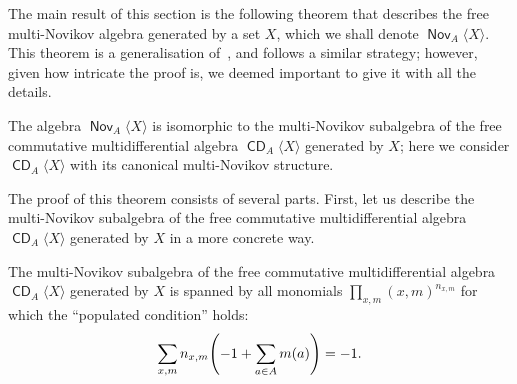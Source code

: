 \documentclass[AHL,Unicode,longabstracts]{cedram}
\DeclareMathOperator{\CDi}{\mathsf{CD}}
\DeclareMathOperator{\Nov}{\mathsf{Nov}}
\let\originalleft\left
\let\originalright\right
\renewcommand{\left}{\mathopen{}\mathclose\bgroup\originalleft}
\renewcommand{\right}{\aftergroup\egroup\originalright}
\begin{document}
The main result of this section is the following theorem that describes the free multi-Novikov algebra generated by a set $X$, which we shall denote $\Nov_A\langle X\rangle$. This theorem is a generalisation of~\cite[Theorem~7.8]{DL}, and follows a similar strategy; however, given how intricate the proof is, we deemed important to give it with all the details.

\begin{theo}\label{th:freeNovikov}
The algebra $\Nov_A\langle X\rangle$ is isomorphic to the multi-Novikov subalgebra of the free commutative multidifferential algebra $\CDi_A\langle X\rangle$ generated by $X$; here we consider $\CDi_A\langle X\rangle$ with its canonical multi-Novikov structure.
\end{theo}

The proof of this theorem consists of several parts. First, let us describe the multi-Novikov subalgebra of the free commutative multidifferential algebra $\CDi_A\langle X\rangle$ generated by $X$ in a more concrete way.

\begin{prop}\label{prop:lowerbound}
The multi-Novikov subalgebra of the free commutative multidifferential algebra $\CDi_A\langle X\rangle$ generated by $X$ is spanned by all monomials $\prod_{x,m}(x,m)^{n_{x,m}}$ for which the ``populated condition'' holds:
\[
\sum_{x,m} n_{x,m}\left(-1+\sum_{a\in A}m(a)\right)=-1.
\]
\end{prop}
\end{document}
